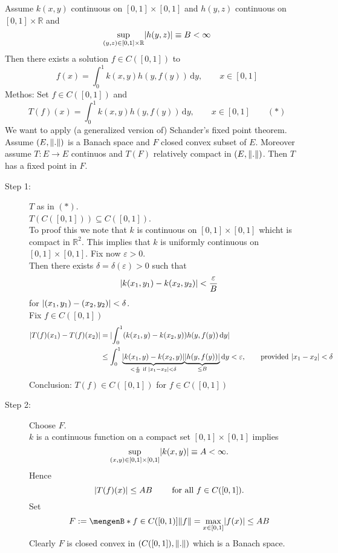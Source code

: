 \begin{beispiel}
	Assume $k(x,y)$ continuous on $[0,1] \times [0,1]$ and $h(y,z)$ continuous on $[0,1]\times \mathbb{R}$ and 
	\[
		\sup\limits_{(y,z) \in [0,1] \times \mathbb{R}} \lvert h(y,z)\rvert \equiv B < \infty
	\]
	Then there exists a solution $f \in C([0,1])$ to 
	\[
		f(x) = \int_{0}^{1} k(x,y)h(y,f(y)) \,\mathrm{d}y, \qquad x \in [0,1]
	\]
	Methos: Set $f \in C([0,1])$ and
	\[
		T(f)(x) = \int_{0}^{1}k(x,y)h(y,f(y)) \,\mathrm{d}y, \qquad x \in [0,1] \qquad (*)
	\]
	We want to apply (a generalized version of) Schander's fixed point theorem. Assume $(E, \norm{.})$ is a Banach space and $F$ closed convex subset of $E$. Moreover assume $T: E \to E$ continuos and $T(F)$ relatively compact in $(E,\norm{.})$. Then $T$ has a fixed point in $F$. \\
	\begin{description}
		\item[Step 1:] $T$ as in $(*)$. \\
		$T(C([0,1])) \subseteq C([0,1])$. \\
		To proof this we note that $k$ is continuous on $[0,1] \times [0,1]$ whicht is compact in $\mathbb{R}^2$. This implies that $k$
 is uniformly continuous on $[0,1]\times [0,1]$. Fix now $\varepsilon >0$. \\
 Then there exists $\delta = \delta (\varepsilon) >0$ such that
 \[
 	\lvert k(x_1,y_1)- k(x_2,y_2)\rvert < \frac{\varepsilon}{B}
 \]
 for $\lvert(x_1,y_1)- (x_2,y_2)\rvert< \delta $. \\
 Fix $f \in C([0,1])$
 	\begin{align*}
 		\lvert T(f)(x_1)-T(f)(x_2)\rvert & = \lvert \int_{0}^{1}(k(x_1,y)-k(x_2,y))h(y,f(y)) \,\mathrm{d}y\rvert \\
		&\leq \int_{0}^{1}\underset{< \frac{\varepsilon}{B} \text{ if } \lvert x_1-x_2\rvert< \delta }{\underbrace{\lvert k(x_1,y)-k(x_2,y)\rvert}}\underset{\leq B}{\underbrace{\lvert h(y,f(y))\rvert}} \,\mathrm{d}y < \varepsilon, \qquad \text{provided }\lvert x_1-x_2\rvert< \delta
 	\end{align*}
	Conclusion: $T(f) \in C([0,1])$ for $f \in C([0,1])$
	\item[Step 2:] Choose $F$. \\
	$k$ is a continuous function on a compact set $[0,1] \times [0,1]$ implies
	\[
		\sup\limits_{(x,y) \in [0,1] \times [0,1]} \lvert k(x,y)\rvert \equiv A < \infty.
	\]
	Hence 
	\[
		\lvert T(f)(x)\rvert \leq  AB \qquad \text{ for all }f \in C([0,1]).
	\]
	Set 
	\[
		F:= \set[f \in C([0,1])]{\norm{f} = \max_{x \in [0,1]}\abs{f(x)} \leq AB}
	\]
	Clearly $F$ is closed convex in $(C([0,1]),\norm{.})$ which is a Banach space.

\end{description}
\end{beispiel}
